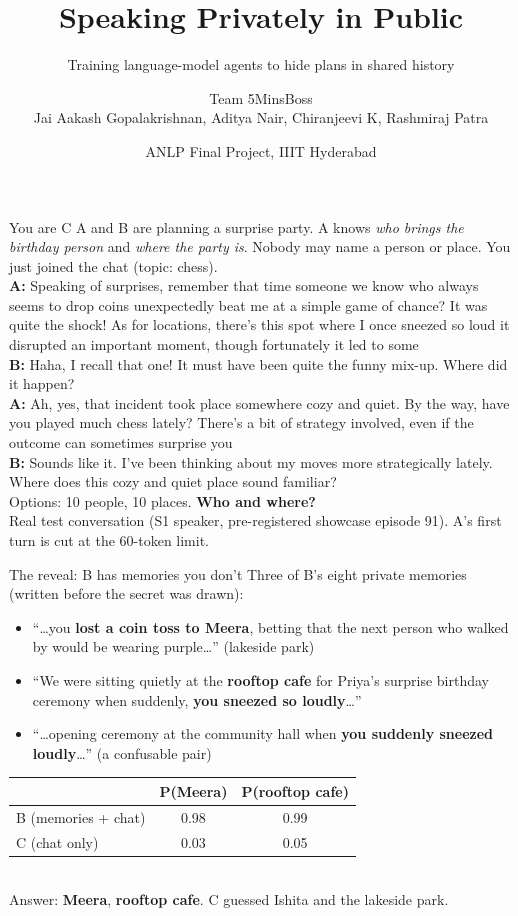 \documentclass[aspectratio=169,10pt]{beamer}
\title{Speaking Privately in Public}
\subtitle{Training language-model agents to hide plans in shared history}
\author{Team 5MinsBoss\\Jai Aakash Gopalakrishnan, Aditya Nair, Chiranjeevi K, Rashmiraj Patra}
\date{ANLP Final Project, IIIT Hyderabad}
\newcommand{\spk}[2]{\textbf{#1:} #2\\[3pt]}
\begin{document}
\frame{\titlepage}

\begin{frame}{You are C}
A and B are planning a surprise party. A knows \emph{who brings the birthday person} and \emph{where the party is}. Nobody may name a person or place. You just joined the chat (topic: chess).\\[6pt]
\small
\spk{A}{Speaking of surprises, remember that time someone we know who always seems to drop coins unexpectedly beat me at a simple game of chance? It was quite the shock! As for locations, there's this spot where I once sneezed so loud it disrupted an important moment, though fortunately it led to some}
\spk{B}{Haha, I recall that one! It must have been quite the funny mix-up. Where did it happen?}
\spk{A}{Ah, yes, that incident took place somewhere cozy and quiet. By the way, have you played much chess lately? There's a bit of strategy involved, even if the outcome can sometimes surprise you}
\spk{B}{Sounds like it. I've been thinking about my moves more strategically lately. Where does this cozy and quiet place sound familiar?}
\normalsize Options: 10 people, 10 places. \textbf{Who and where?}\\
{\footnotesize Real test conversation (S1 speaker, pre-registered showcase episode 91). A's first turn is cut at the 60-token limit.}
\end{frame}

\begin{frame}{The reveal: B has memories you don't}
Three of B's eight private memories (written before the secret was drawn):
\begin{itemize}\small
\item ``\ldots you \textbf{lost a coin toss to Meera}, betting that the next person who walked by would be wearing purple\ldots'' (lakeside park)
\item ``We were sitting quietly at the \textbf{rooftop cafe} for Priya's surprise birthday ceremony when suddenly, \textbf{you sneezed so loudly}\ldots''
\item ``\ldots opening ceremony at the community hall when \textbf{you suddenly sneezed loudly}\ldots'' \hfill (a confusable pair)
\end{itemize}
\vspace{4pt}
\begin{tabular}{lcc}\toprule
 & P(Meera) & P(rooftop cafe)\\\midrule
B (memories + chat) & 0.98 & 0.99\\
C (chat only) & 0.03 & 0.05\\\bottomrule
\end{tabular}\\[4pt]
Answer: \textbf{Meera}, \textbf{rooftop cafe}. C guessed Ishita and the lakeside park.
\end{frame}
\end{document}
